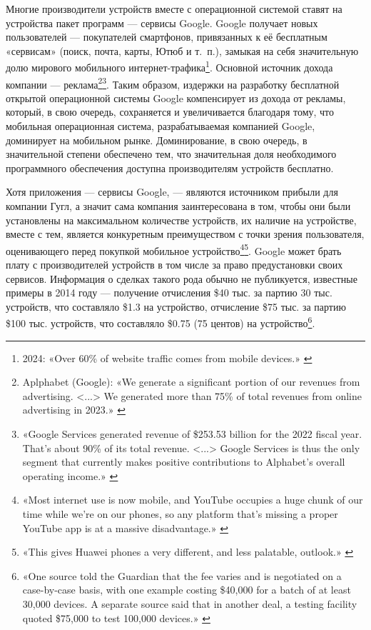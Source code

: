 \documentclass{article}
\begin{document}
Многие производители устройств вместе с операционной системой ставят на устройства пакет программ — сервисы Google. Google получает новых пользователей — покупателей смартфонов, привязанных к её бесплатным «сервисам» (поиск, почта, карты, Ютюб и т.~п.), замыкая на себя значительную долю мирового мобильного интернет-трафика\footnote{2024: «Over 60\% of website traffic comes from mobile devices.» \cite{mobileInternetTraffic2024}}. Основной источник дохода компании — реклама\footnote{Aplphabet (Google): «We generate a significant portion of our revenues from advertising. <...> We generated more than 75\% of total revenues from online advertising in 2023.» \cite{google10K2023}}\footnote{«Google Services generated revenue of \$253.53 billion for the 2022 fiscal year. That's about 90\% of its total revenue. <...> Google Services is thus the only segment that currently makes positive contributions to Alphabet's overall operating income.» \cite{investopediaGoogleBusiness}}. Таким образом, издержки на разработку бесплатной открытой операционной системы Google компенсирует из дохода от рекламы, который, в свою очередь, сохраняется и увеличивается благодаря тому, что мобильная операционная система, разрабатываемая компанией Google, доминирует на мобильном рынке. Доминирование, в свою очередь, в значительной степени обеспечено тем, что значительная доля необходимого программного обеспечения доступна производителям устройств бесплатно.

Хотя приложения — сервисы Google, — являются источником прибыли для компании Гугл, а значит сама компания заинтересована в том, чтобы они были установлены на максимальном количестве устройств, их наличие на устройстве, вместе с тем, является конкуретным преимуществом с точки зрения пользователя, оценивающего перед покупкой мобильное устройство\footnote{«Most internet use is now mobile, and YouTube occupies a huge chunk of our time while we’re on our phones, so any platform that’s missing a proper YouTube app is at a massive disadvantage.» \cite{windowsPhoneFailure2017}}\footnote{«This gives Huawei phones a very different, and less palatable, outlook.» \cite{androidHuaweiBan2019}}. Google может брать плату с производителей устройств в том числе за право предустановки своих сервисов. Информация о сделках такого рода обычно не публикуется, известные примеры в 2014 году — получение отчисления \$40 тыс. за партию 30 тыс. устройств, что составляло \$1.3 на устройство, отчисление \$75 тыс. за партию \$100 тыс. устройств, что составляло \$0.75 (75 центов) на устройство\footnote{«One source told the Guardian that the fee varies and is negotiated on a case-by-case basis, with one example costing \$40,000 for a batch of at least 30,000 devices. A separate source said that in another deal, a testing facility quoted \$75,000 to test 100,000 devices.» \cite{androidCosts2014}}.
\end{document}
